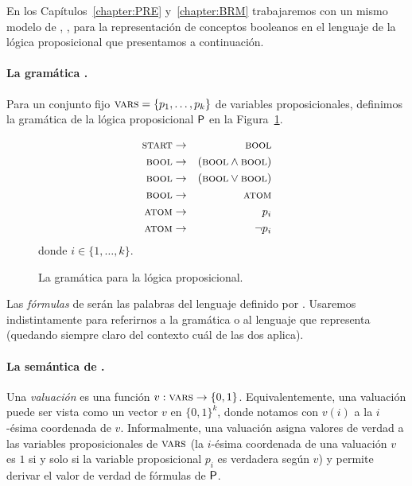 
En los Capítulos~\ref{chapter:PRE} y~\ref{chapter:BRM} trabajaremos con un mismo modelo de \lot, \grambool, para la representación de conceptos booleanos en el lenguaje de la lógica proposicional que presentamos a continuación.

\paragraph{La gramática \grambool.}
Para un conjunto fijo $\textsc{vars}=\{p_1,\dots,p_k\}$ de variables proposicionales, definimos la gramática de la lógica proposicional ${\sf P}$ en la Figura~\ref{fig:grambool}.
%
\renewcommand{\thefigure}{PII.1}
\begin{figure}[h!]
\begin{eqnarray*}
\textsc{start} &\to&\textsc{bool}\\
\textsc{bool} &\to&(\textsc{bool} \wedge \textsc{bool}) \\
\textsc{bool} &\to&(\textsc{bool} \vee \textsc{bool}) \\
\textsc{bool} &\to&\textsc{atom}\\
\textsc{atom} &\to& p_i \\
\textsc{atom} &\to&\lnot p_i 
\end{eqnarray*}
donde $i\in\{1,\dots,k\}$.
\caption{La gramática \grambool para la lógica proposicional.}
\label{fig:grambool}
\end{figure}
%
Las {\em fórmulas} de \grambool serán las palabras del lenguaje definido por \grambool. Usaremos indistintamente \grambool para referirnos a la gramática o al lenguaje que representa (quedando siempre claro del contexto cuál de las dos aplica).


\paragraph{La semántica de \grambool.}
Una {\em valuación} es una función $v:\textsc{vars}\to\{0,1\}$. Equivalentemente, una valuación puede ser vista como un vector $v$ en $\{0,1\}^k$, donde notamos con $v(i)$ a la $i$-ésima coordenada de $v$. Informalmente, una valuación asigna valores de verdad a las variables proposicionales de $\textsc{vars}$ (la $i$-ésima coordenada de una valuación $v$ es $1$ si y solo si la variable proposicional $p_i$ es verdadera según $v$) y permite derivar el valor de verdad de fórmulas de ${\sf P}$.  

